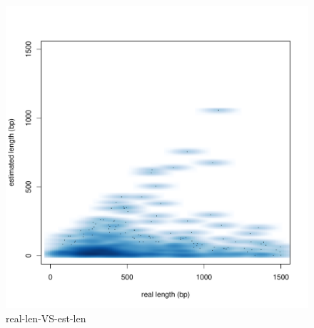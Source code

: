 \begin{figure}[!t]
\centering
\includegraphics[width=\textwidth]{figures/lenest/real-len-VS-est-len.pdf}
\caption{real-len-VS-est-len}
\label{}
\end{figure}



